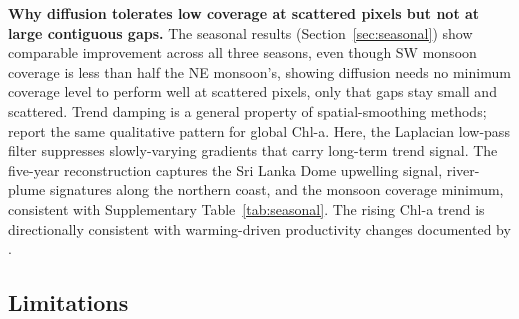 \documentclass[final,5p,times,twocolumn,authoryear]{elsarticle}
\begin{document}
\textbf{Why diffusion tolerates low coverage at scattered pixels but
not at large contiguous gaps.} The seasonal results
(Section~\ref{sec:seasonal}) show comparable improvement across all
three seasons, even though SW monsoon coverage is less than half the
NE monsoon's, showing diffusion needs no minimum coverage level to
perform well at scattered pixels, only that gaps stay small and
scattered. Trend damping is a general property of spatial-smoothing
methods; \citet{martinez2020frontiers} report the same qualitative
pattern for global Chl-a. Here, the Laplacian low-pass filter
suppresses slowly-varying gradients that carry long-term trend
signal. The five-year reconstruction captures the Sri Lanka Dome
upwelling signal, river-plume signatures along the northern coast,
and the monsoon coverage minimum, consistent with
Supplementary Table~\ref{tab:seasonal}. The rising Chl-a trend is directionally
consistent with warming-driven productivity changes documented by
\citet{roxy2016}.

\subsection{Limitations}
\label{sec:limitations}
\end{document}
